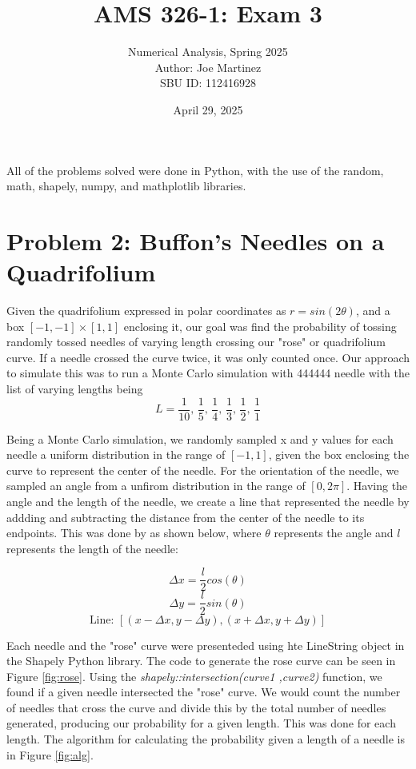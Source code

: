 \documentclass{article}
\title{AMS 326-1: Exam 3}
\author{
Numerical Analysis, Spring 2025 \\
Author: Joe Martinez \\
SBU ID: 112416928
}
\date{April 29, 2025}
\begin{document}
\maketitle

All of the problems solved were done in Python, with the use of the random, math, shapely, numpy, and mathplotlib libraries.

\section{Problem 2: Buffon's Needles on a Quadrifolium}
Given the quadrifolium expressed in polar coordinates as $r=sin(2\theta)$, and a box $[-1, -1]\times [1, 1]$ enclosing it, our goal was find the probability of tossing randomly tossed needles of varying length crossing our "rose" or quadrifolium curve. If a needle crossed the curve twice, it was only counted once. Our approach to simulate this was to run a Monte Carlo simulation with 444444 needle with the list of varying lengths being
\[
    L=\frac{1}{10}\text{, } \frac{1}{5}\text{, } \frac{1}{4}\text{, } \frac{1}{3}\text{, } \frac{1}{2}\text{, } \frac{1}{1}
\]


Being a Monte Carlo simulation, we randomly sampled x and y values for each needle a uniform distribution in the range of $[-1,1]$, given the box enclosing the curve to represent the center of the needle. For the orientation of the needle, we sampled an angle from a unfirom distribution in the range of $[0, 2\pi]$. Having the angle and the length of the needle, we create a line that represented the needle by addding and subtracting the distance from the center of the needle to its endpoints. This was done by as shown below, where $\theta$ represents the angle and $l$ represents the length of the needle:

\[\Delta x = \frac{l}{2}cos(\theta)\]
\[\Delta y = \frac{l}{2}sin(\theta)\]
\[\text{Line: } [(x - \Delta x, y - \Delta y), (x + \Delta x, y + \Delta y)]\]

Each needle and the "rose" curve were presenteded using hte LineString object in the Shapely Python library. The code to generate the rose curve can be seen in Figure \ref{fig:rose}. Using the \textit{shapely::intersection(curve1 ,curve2)} function, we found if a given needle intersected the "rose" curve. We would count the number of needles that cross the curve and divide this by the total number of needles generated, producing our probability for a given length. This was done for each length. The algorithm for calculating the probability given a length of a needle is in Figure \ref{fig:alg}.
\end{document}
